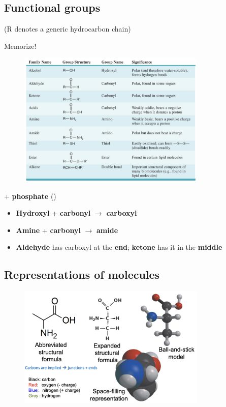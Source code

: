 \documentclass[letterpaper, 12pt]{article}
\begin{document}
\subsection*{Functional groups}

(R denotes a generic hydrocarbon chain)

Memorize!

\begin{figure}[H]
\centering
\includegraphics[width=0.8\textwidth]{functionalgroups}
\end{figure}

+ \textbf{phosphate} ()

\begin{itemize}
\item \textbf{Hydroxyl} + \textbf{carbonyl} $\to$ \textbf{carboxyl}
\item \textbf{Amine} + \textbf{carbonyl} $\to$ \textbf{amide}
\item \textbf{Aldehyde} has carboxyl at the \textbf{end}; \textbf{ketone} has it in the \textbf{middle}
\end{itemize}

\subsection*{Representations of molecules}

\begin{figure}[H]
\centering
\includegraphics[width=0.8\textwidth]{models}
\end{figure}
\end{document}
